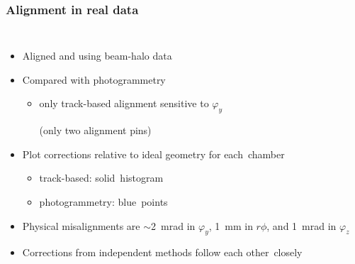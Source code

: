 \documentclass[compress]{beamer}
\begin{document}
\begin{frame}
\frametitle{Alignment in real data}

\vfill
\begin{columns}
\begin{itemize}
\item Aligned  and  using beam-halo data
\item Compared with \mbox{photogrammetry\hspace{-1 cm}}
\begin{itemize}
\item only track-based alignment sensitive to $\varphi_y$

(only two alignment pins)
\end{itemize}
\item Plot corrections relative to ideal geometry for \mbox{each chamber\hspace{-1 cm}}
\begin{itemize}
\item track-based: \mbox{solid histogram\hspace{-1 cm}}
\item photogrammetry: \mbox{blue points\hspace{-1 cm}}
\end{itemize}
\item Physical misalignments are $\sim$2~mrad in $\varphi_y$, 1~mm in $r\phi$, and 1~mrad in $\varphi_z$
\item Corrections from independent methods follow each \mbox{other closely\hspace{-1 cm}}
\end{itemize}


\end{columns}
\end{frame}
\end{document}
